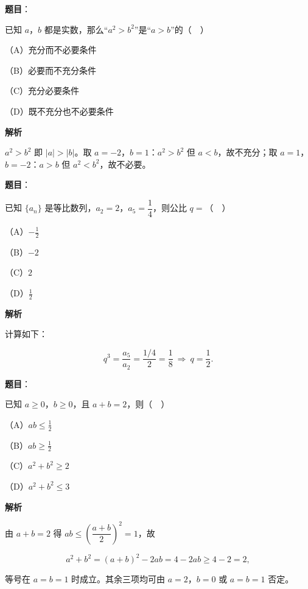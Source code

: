 \begin{answer}

\textbf{题目}：

已知 $a$，$b$ 都是实数，那么“$a^2>b^2$”是“$a>b$”的（　）

（A）充分而不必要条件

（B）必要而不充分条件

（C）充分必要条件

（D）既不充分也不必要条件

\textbf{解析}

$a^2>b^2$ 即 $|a|>|b|$。取 $a=-2$，$b=1$：$a^2>b^2$ 但 $a<b$，故不充分；取 $a=1$，$b=-2$：$a>b$ 但 $a^2<b^2$，故不必要。


\end{answer}
\begin{answer}

\textbf{题目}：

已知 $\{a_n\}$ 是等比数列，$a_2=2$，$a_5=\dfrac14$，则公比 $q=$（　）

（A）$-\frac12$

（B）$-2$

（C）$2$

（D）$\frac12$

\textbf{解析}

计算如下：

\nopagebreak[4]
\[q^3=\frac{a_5}{a_2}=\frac{1/4}2=\frac18\ \Longrightarrow\ q=\frac12.\]


\end{answer}
\begin{answer}

\textbf{题目}：

已知 $a\geqslant0$，$b\geqslant0$，且 $a+b=2$，则（　）

（A）$ab\leqslant\frac12$

（B）$ab\geqslant\frac12$

（C）$a^2+b^2\geqslant2$

（D）$a^2+b^2\leqslant3$

\textbf{解析}

由 $a+b=2$ 得 $ab\leqslant\left(\dfrac{a+b}2\right)^2=1$，故

\nopagebreak[4]
\[a^2+b^2=(a+b)^2-2ab=4-2ab\geqslant4-2=2,\]

等号在 $a=b=1$ 时成立。其余三项均可由 $a=2$，$b=0$ 或 $a=b=1$ 否定。


\end{answer}
